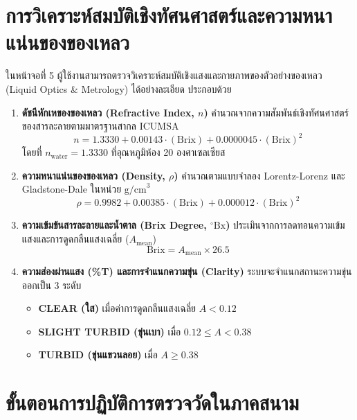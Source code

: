 \section{การวิเคราะห์สมบัติเชิงทัศนศาสตร์และความหนาแน่นของของเหลว}
ในหน้าจอที่ 5 ผู้ใช้งานสามารถตรวจวิเคราะห์สมบัติเชิงแสงและกายภาพของตัวอย่างของเหลว (Liquid Optics \& Metrology) ได้อย่างละเอียด ประกอบด้วย
\begin{enumerate}[leftmargin=1.5em, itemsep=3pt]
    \item \textbf{ดัชนีหักเหของของเหลว (Refractive Index, $n$)} คำนวณจากความสัมพันธ์เชิงทัศนศาสตร์ของสารละลายตามมาตรฐานสากล ICUMSA
    \begin{equation}
        n = 1.3330 + 0.00143 \cdot (\text{Brix}) + 0.0000045 \cdot (\text{Brix})^2
    \end{equation}
    โดยที่ $n_{\text{water}} = 1.3330$ ที่อุณหภูมิห้อง 20 องศาเซลเซียส
    \item \textbf{ความหนาแน่นของของเหลว (Density, $\rho$)} คำนวณตามแบบจำลอง Lorentz-Lorenz และ Gladstone-Dale ในหน่วย $\text{g/cm}^3$
    \begin{equation}
        \rho = 0.9982 + 0.00385 \cdot (\text{Brix}) + 0.000012 \cdot (\text{Brix})^2
    \end{equation}
    \item \textbf{ความเข้มข้นสารละลายและน้ำตาล (Brix Degree, $^\circ\text{Bx}$)} ประเมินจากการลดทอนความเข้มแสงและการดูดกลืนแสงเฉลี่ย ($A_{\text{mean}}$)
    \begin{equation}
        \text{Brix} = A_{\text{mean}} \times 26.5
    \end{equation}
    \item \textbf{ความส่องผ่านแสง (\%T) และการจำแนกความขุ่น (Clarity)}
    ระบบจะจำแนกสถานะความขุ่นออกเป็น 3 ระดับ
    \begin{itemize}[leftmargin=1.5em, itemsep=2pt]
        \item \textbf{CLEAR (ใส)} เมื่อค่าการดูดกลืนแสงเฉลี่ย $A < 0.12$
        \item \textbf{SLIGHT TURBID (ขุ่นเบา)} เมื่อ $0.12 \le A < 0.38$
        \item \textbf{TURBID (ขุ่นแขวนลอย)} เมื่อ $A \ge 0.38$
    \end{itemize}
\end{enumerate}

\section{ขั้นตอนการปฏิบัติการตรวจวัดในภาคสนาม}
